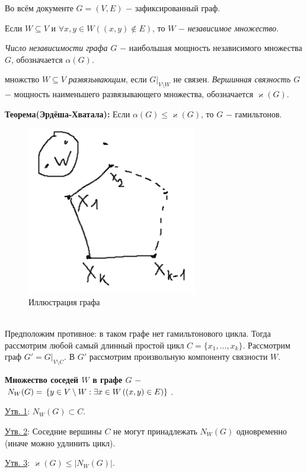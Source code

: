 Во всём документе $G=(V, E)$ $-$ зафиксированный граф.

\Def Если $W \subseteq V$ и $\forall x, y \in W((x, y) \notin E)$, то $W$ $-$ \textit{независимое множество}.

\Def \textit{Число независимости графа $G$} $-$ наибольшая мощность независимого множества $G$, обозначается $\alpha(G)$.

\Def множство $W \subseteq V$ \textit{развязывающим}, если $G \Big|_{V \setminus W}$ не связен. \textit{Вершинная связность $G$} $-$ мощность наименьшего развязывающего множества, обозначается $\varkappa(G)$.

\textbf{Теорема(Эрдёша-Хватала):} Если $\alpha(G) \leqslant \varkappa(G)$, то $G$ $-$ гамильтонов.
\begin{figure}
				\includegraphics[scale = 0.40]{images/E-H_graph.png}
				\caption{Иллюстрация графа}
\end{figure} \\
\Proof Предположим противное: в таком графе нет гамильтонового цикла. Тогда рассмотрим любой самый длинный простой цикл $C=\{x_1, ..., x_k\}$. Рассмотрим граф $G'=G \big |_{V \setminus C}$. В $G'$ рассмотрим произвольную компоненту связности $W$. 

\textbf{Множество соседей $W$ в графе $G$} $-$ $N_W(G)= \newline \left \{ y \in V \setminus W : \exists x \in W\left( (x, y) \in E \right) \right \}$.

\underline{Утв. 1}: $N_W(G) \subset C$.

\underline{Утв. 2}: Соседние вершины $C$ не могут принадлежать $N_W(G)$ одновременно (иначе можно удлинить цикл).

\underline{Утв. 3}: $\varkappa(G) \leqslant |N_W(G)|$.


